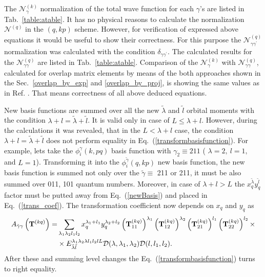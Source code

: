 \documentclass[12pt,a4paper,twoside]{article}
\begin{document}
The $\mathcal{N}_{\gamma}^{(k)}$ normalization of the total wave function for each $\gamma$'s are listed in Tab.~\ref{table:atable}.
It has no physical reasons to calculate the normalization $\mathcal{N}^{(q)}$ in the $(q,kp)$ scheme. However, for verification of expressed above equations it would be useful to show their correctness. For this purpose the $\mathcal{N}_{\gamma \gamma^{\prime}}^{(q)}$ normalization was calculated with the condition $\delta_{\gamma \gamma^{\prime}}$. The calculated results for the $\mathcal{N}_{\gamma \gamma}^{(q)}$ are listed in Tab.~\ref{table:atable}. Comparison of the $\mathcal{N}_{\gamma}^{(k)}$ with $\mathcal{N}_{\gamma \gamma}^{(q)}$, calculated for overlap matrix elements by means of the both approaches  shown in the Sec.~\ref{overlap_by_exp}  and \ref{overlap_by_proj}, is showing   the same values as in Ref. \cite{voronchev1994analysis}. That means correctness of all above deduced equations.

New basis functions are summed over all the new $\tilde{\lambda}$ and $\tilde{l}$ orbital moments with the condition $\lambda + l = \tilde{\lambda} +\tilde{l} $. It is valid only in case of $L \le \lambda + l$. However, during the calculations it was revealed, that in the $L < \lambda + l$  case, the condition $\lambda + l = \tilde{\lambda} +\tilde{l} $ does not perform equality in Eq.~(\ref{transformbasisfunction}). For example, lets take the  $\phi_{i}^{\gamma}\left(k, pq \right)$ basis function with $\gamma_2 \equiv 211$ ( $\lambda=2,~l=1,$ and $L=1$). Transforming it into the $\phi_{i}^{\tilde{\gamma}}\left(q, kp \right)$ new basis function, the new basis function is summed not only over the $\tilde{\gamma}\equiv$ 211 or 211, it must be also summed over 011, 101 quantum numbers. 
Moreover,  in case of $\lambda+l > L$  the $x_{q}^{\tilde{\lambda}} y_{q}^{\tilde{l}}$ factor  must be putted away from Eq.~(\ref{newBasis}) and placed in Eq.~(\ref{trans_coef}). The transformation coefficient now depends on $x_q$ and $y_q$ as
\begin{align*}
A_{\tilde{\gamma}\gamma}\left( {\bf T}^{(kq)} \right) = & \sum_{\lambda_1 \lambda_2 l_1 l_2} 
x_{q}^{\lambda_1+l_1} y_{q}^{\lambda_2+l_2}
\left({\bf T}_{11}^{(kq)} \right)^{\lambda_1} 
\left({\bf T}_{12}^{(kq)} \right)^{\lambda_2} 
\left({\bf T}_{21}^{(kq)} \right)^{l_1} 
\left({\bf T}_{22}^{(kq)} \right)^{l_2} 
\times 
\\
& \times {E}^{\lambda_1 \lambda_2 \lambda l_1 l_2 l L}_{\tilde{\lambda} \tilde{l} } \mathcal{D}(\lambda,\lambda_1,\lambda_2) \mathcal{D}(l,l_1,l_2).   \nonumber 
\end{align*}
After these and summing level changes the  Eq.~(\ref{transformbasisfunction}) turns to right equality.
\end{document}
